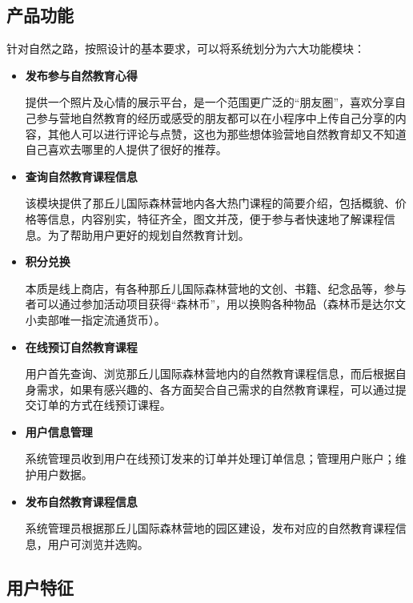 \subsection{产品功能}
针对自然之路，按照设计的基本要求，可以将系统划分为六大功能模块：
\begin{itemize}
\item \textbf{发布参与自然教育心得}

提供一个照片及心情的展示平台，是一个范围更广泛的“朋友圏”，喜欢分享自己参与营地自然教育的经历或感受的朋友都可以在小程序中上传自己分享的内容，其他人可以进行评论与点赞，这也为那些想体验营地自然教育却又不知道自己喜欢去哪里的人提供了很好的推荐。

\item \textbf{查询自然教育课程信息}

该模块提供了那丘儿国际森林营地内各大热门课程的简要介绍，包括概貌、价格等信息，内容别实，特征齐全，图文并茂，便于参与者快速地了解课程信息。为了帮助用户更好的规划自然教育计划。

\item \textbf{积分兑换}

本质是线上商店，有各种那丘儿国际森林营地的文创、书籍、纪念品等，参与者可以通过参加活动项目获得“森林币”，用以换购各种物品（森林币是达尔文小卖部唯一指定流通货币）。

\item \textbf{在线预订自然教育课程}

用户首先查询、浏览那丘儿国际森林营地内的自然教育课程信息，而后根据自身需求，如果有感兴趣的、各方面契合自己需求的自然教育课程，可以通过提交订单的方式在线预订课程。

\item \textbf{用户信息管理}

系统管理员收到用户在线预订发来的订单并处理订单信息；管理用户账户；维护用户数据。

\item \textbf{发布自然教育课程信息}

系统管理员根据那丘儿国际森林营地的园区建设，发布对应的自然教育课程信息，用户可浏览并选购。

\end{itemize}

\subsection{用户特征}
